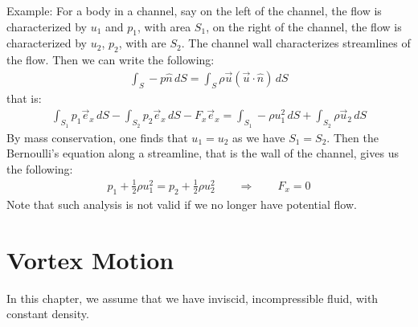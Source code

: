 \documentclass[11pt]{book}
\theoremstyle{break}
\theoremstyle{break}
\newcommand{\example}{\color{green}Example: \color{black}}
\begin{document}
\example For a body in a channel, say on the left of the channel, the flow is characterized by $u_1$ and $p_1$, with area $S_1$, on the right of the channel, the flow is characterized by $u_2$, $p_2$, with are $S_2$. The channel wall characterizes streamlines of the flow. Then we can write the following:
\begin{align*}
\int_S -p \hat{n}\, dS = \int_S \rho \vec{u}(\vec{u}\cdot \hat{n})\, dS
\end{align*}
that is:
\begin{align*}
\int_{S_1}p_1 \vec{e}_x\, dS - \int_{S_2}p_2 \vec{e}_x \, dS - F_x \vec{e}_x = \int_{S_1}-\rho u_1^2 \, dS + \int_{S_2} \rho \vec{u}_2 \, dS
\end{align*}
By mass conservation, one finds that $u_1 = u_2$ as we have $S_1 = S_2$. Then the Bernoulli's equation along a streamline, that is the wall of the channel, gives us the following:
\begin{align*}
p_1 + \frac{1}{2}\rho u_1^2 = p_2 + \frac{1}{2}\rho u_2^2 \qquad \Rightarrow \qquad F_x = 0
\end{align*}
Note that such analysis is not valid if we no longer have potential flow. \\


\newpage
\chapter{Vortex Motion}
\setcounter{section}{11}

In this chapter, we assume that we have inviscid, incompressible fluid, with constant density. \\
\end{document}
